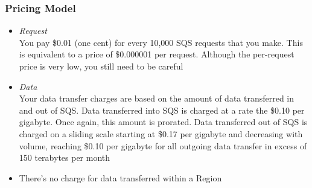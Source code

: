 \documentclass{beamer}
\begin{document}
\begin{frame}
\frametitle{Pricing Model}
\begin{itemize}
\item \emph{Request}\\You pay \$0.01 (one cent) for every 10,000 SQS requests that you make. This is
equivalent to a price of \$0.000001 per request. Although the per-request price is very low, you still need to be careful
\item \emph{Data}\\Your data transfer charges are based on the amount of data transferred in and out
of SQS. Data transferred into SQS is charged at a rate the \$0.10 per gigabyte. Once
again, this amount is prorated. Data transferred out of SQS is charged on a sliding
scale starting at \$0.17 per gigabyte and decreasing with volume, reaching \$0.10 per
gigabyte for all outgoing data transfer in excess of 150 terabytes per month
\item There’s no charge for data transferred within a Region
\end{itemize}
\end{frame}
\end{document}

